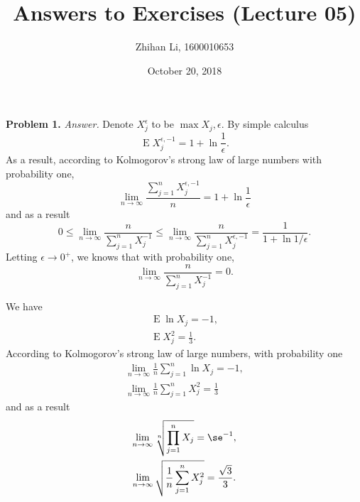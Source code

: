 \documentclass[english, nochinese]{pnote}
\title{Answers to Exercises (Lecture 05)}
\author{Zhihan Li, 1600010653}
\date{October 20, 2018}
\DeclareMathOperator\ope{\mathrm{E}}
\begin{document}
\maketitle

\textbf{Problem 1.} \textit{Answer.} Denote $X_j^{\epsilon}$ to be $ \max{ X_j, \epsilon } $. By simple calculus
\begin{equation}
\ope X_j^{ \epsilon, -1 } = 1 + \ln \frac{1}{\epsilon}.
\end{equation}
As a result, according to Kolmogorov's strong law of large numbers with probability one,
\begin{equation}
\lim_{ n \rightarrow \infty } \frac{ \sum_{ j = 1 }^n X_j^{ \epsilon, -1 } }{n} = 1 + \ln \frac{1}{\epsilon}
\end{equation}
and as a result
\begin{equation*}
0 \le \lim_{ n \rightarrow \infty } \frac{n}{ \sum_{ j = 1 }^n X_j^{-1} } \le \lim_{ n \rightarrow \infty } \frac{n}{ \sum_{ j = 1 }^n X_j^{ \epsilon, -1 } } = \frac{1}{ 1 + \ln 1 / \epsilon }.
\end{equation*}
Letting $ \epsilon \rightarrow 0^+ $, we knows that with probability one,
\begin{equation}
\lim_{ n \rightarrow \infty } \frac{n}{ \sum_{ j = 1 }^n X_j^{-1} } = 0.
\end{equation}

We have
\begin{gather}
\ope \ln X_j = -1, \\
\ope X_j^2 = \frac{1}{3}.
\end{gather}
According to Kolmogorov's strong law of large numbers, with probability one
\begin{gather}
\lim_{ n \rightarrow \infty } \frac{1}{n} \sum_{ j = 1 }^n \ln X_j = -1, \\
\lim_{ n \rightarrow \infty } \frac{1}{n} \sum_{ j = 1 }^n X_j^2 = \frac{1}{3}
\end{gather}
and as a result
\begin{gather}
\lim_{ n \rightarrow \infty } \sqrt[n]{ \prod_{ j = 1 }^n X_j } = \se^{-1}, \\
\lim_{ n \rightarrow \infty } \sqrt{ \frac{1}{n} \sum_{ j = 1 }^n X_j^2 } = \frac{\sqrt{3}}{3}.
\end{gather}
\end{document}
